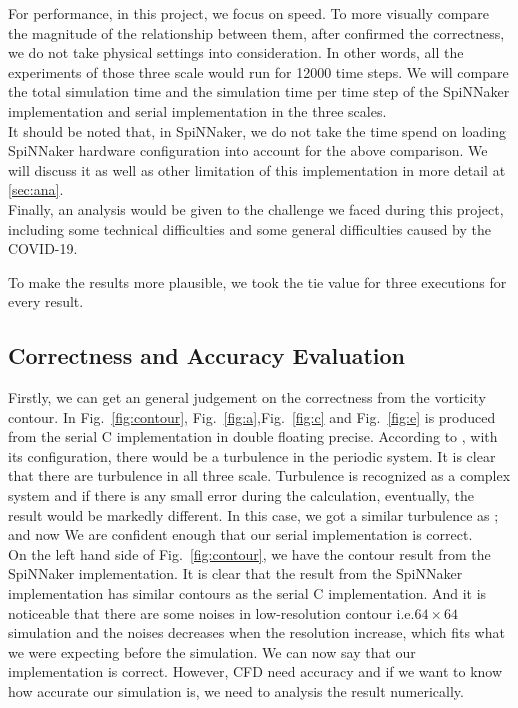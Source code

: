 For performance, in this project, we focus on speed. To more visually compare the magnitude of the relationship between them, after confirmed the correctness, we do not take physical settings into consideration. In other words, all the experiments of those three scale would run for 12000 time steps. We will compare the total simulation time and the simulation time per time step of the SpiNNaker implementation and serial implementation in the three scales. \\

It should be noted that, in SpiNNaker, we do not take the time spend on loading SpiNNaker hardware configuration into account for the above comparison. We will discuss it as well as other limitation of this implementation in more detail at \ref{sec:ana}.\\

Finally, an analysis would be given to the challenge we faced during this project, including some technical difficulties and some general difficulties caused by the COVID-19.

To make the results more plausible, we took the tie value for three executions for every result.\\
\subsection{Correctness and Accuracy Evaluation} \label{sec:caae}
Firstly, we can get an general judgement on the correctness from the vorticity contour. In Fig.~\ref{fig:contour}, Fig.~\ref{fig:a},Fig.~\ref{fig:c} and Fig.~\ref{fig:e} is produced from the serial C implementation in double floating precise. According to \cite{minion1997performance}, with its configuration, there would be a turbulence in the periodic system. It is clear that there are turbulence in all three scale. Turbulence is recognized as a complex system and if there is any small error during the calculation, eventually, the result would be markedly different. In this case, we got a similar turbulence as \cite{minion1997performance}; and now We are confident enough that our serial implementation is correct.\\

On the left hand side of Fig.~\ref{fig:contour}, we have the contour result from the SpiNNaker implementation. It is clear that the result from the SpiNNaker implementation has similar contours as the serial C implementation. And it is noticeable that there are some noises in low-resolution contour i.e.$64\times64$ simulation and the noises decreases when the resolution increase, which fits what we were expecting before the simulation. We can now say that our implementation is correct. However, CFD need accuracy and if we want to know how accurate our simulation is, we need to analysis the result numerically.\\


